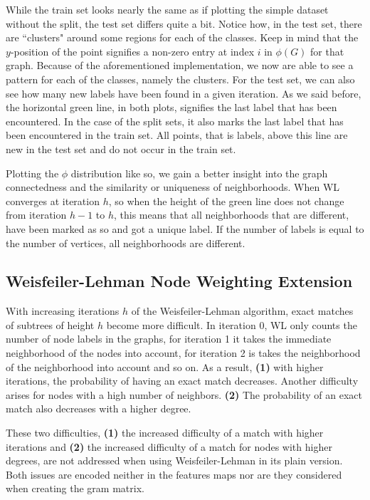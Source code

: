 While the train set looks nearly the same as if plotting the simple dataset without the split, the test set differs quite a bit.
Notice how, in the test set, there are ``clusters" around some regions for each of the classes. 
Keep in mind that the $y$-position of the point signifies a non-zero entry at index $i$ in $\phi(G)$ for that graph.
Because of the aforementioned implementation, we now are able to see a pattern for each of the classes, namely the clusters.
For the test set, we can also see how many new labels have been found in a given iteration.
As we said before, the horizontal green line, in both plots, signifies the last label that has been encountered.
In the case of the split sets, it also marks the last label that has been encountered in the train set.
All points, that is labels, above this line are new in the test set and do not occur in the train set.

Plotting the $\phi$ distribution like so, we gain a better insight into the graph connectedness and the similarity or uniqueness of neighborhoods.
When WL converges at iteration $h$, so when the height of the green line does not change from iteration $h-1$ to $h$, this means that all neighborhoods that are different, have been marked as so and got a unique label.
If the number of labels is equal to the number of vertices, all neighborhoods are different.


\subsection{Weisfeiler-Lehman Node Weighting Extension}
With increasing iterations $h$ of the Weisfeiler-Lehman algorithm, exact matches of subtrees of height $h$ become more difficult.
In iteration 0, WL only counts the number of node labels in the graphs, for iteration 1 it takes the immediate neighborhood of the nodes into account, for iteration 2 is takes the neighborhood of the neighborhood into account and so on.
As a result, \textbf{(1)} with higher iterations, the probability of having an exact match decreases. Another difficulty arises for nodes with a high number of neighbors. \textbf{(2)} The probability of an exact match also decreases with a higher degree.

These two difficulties, \textbf{(1)} the increased difficulty of a match with higher iterations and \textbf{(2)} the increased difficulty of a match for nodes with higher degrees, are not addressed when using Weisfeiler-Lehman in its plain version. Both issues are encoded neither in the features maps nor are they considered when creating the gram matrix.

